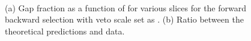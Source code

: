 \begin{figure}
\centering
\mbox{
              \quad
              \quad
}
\caption[Gap fraction as a function of \dy{} for forward backward selection and variable \qz{}]{ 
(a) Gap fraction as a function of \dy{} for various \ptb{} slices for the forward backward selection with veto scale set as \ptb{}. 
(b) Ratio between the theoretical predictions and data. 
\label{GBJ1:pTSelBQ0}}
\end{figure}

